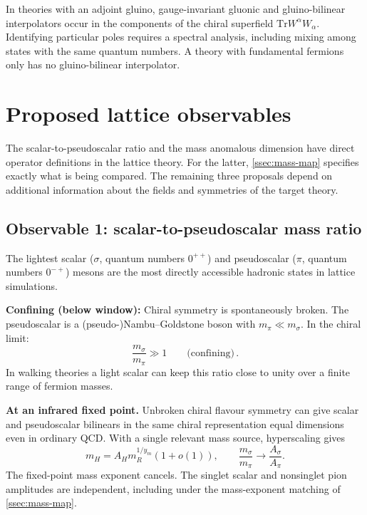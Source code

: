 \documentclass[11pt,a4paper]{article}
\theoremstyle{plain}
\theoremstyle{definition}
\theoremstyle{remark}
\newcommand{\Tr}{\mathrm{Tr}}
\begin{document}
In theories with an adjoint gluino, gauge-invariant gluonic and
gluino-bilinear interpolators occur in the components of the chiral
superfield $\Tr W^\alpha W_\alpha$.  Identifying particular poles
requires a spectral analysis, including mixing among states with the
same quantum numbers.  A theory with fundamental fermions only has
no gluino-bilinear interpolator.

\section{Proposed lattice observables}
\label{sec:observables}

The scalar-to-pseudoscalar ratio and the mass anomalous dimension
have direct operator definitions in the lattice theory.  For the
latter, \cref{ssec:mass-map} specifies exactly what is being compared.
The remaining three proposals depend on additional information about
the fields and symmetries of the target theory.

\subsection{Observable 1: scalar-to-pseudoscalar mass ratio}
\label{ssec:obs1}

The lightest scalar ($\sigma$, quantum numbers $0^{++}$) and
pseudoscalar ($\pi$, quantum numbers $0^{-+}$) mesons are the most
directly accessible hadronic states in lattice simulations.

\textbf{Confining (below window):}  Chiral symmetry is spontaneously
broken.  The pseudoscalar is a (pseudo-)Nambu--Goldstone boson with
$m_\pi \ll m_\sigma$.  In the chiral limit:
\begin{equation}\label{eq:conf-ratio}
  \frac{m_\sigma}{m_\pi} \gg 1
  \qquad\text{(confining)}\,.
\end{equation}
In walking theories a light scalar can keep this ratio close to
unity over a finite range of fermion masses.

\textbf{At an infrared fixed point.}  Unbroken chiral flavour
symmetry can give scalar and pseudoscalar bilinears in the same chiral
representation equal dimensions even in ordinary QCD.  With a single
relevant mass source, hyperscaling gives
\begin{equation}\label{eq:BZ-ratio}
  m_H=A_H m_R^{1/y_m}(1+o(1)),\qquad
  \frac{m_\sigma}{m_\pi}\longrightarrow\frac{A_\sigma}{A_\pi}.
\end{equation}
The fixed-point mass exponent cancels.  The singlet scalar and
nonsinglet pion amplitudes are independent, including under the
mass-exponent matching of \cref{ssec:mass-map}.
\end{document}
